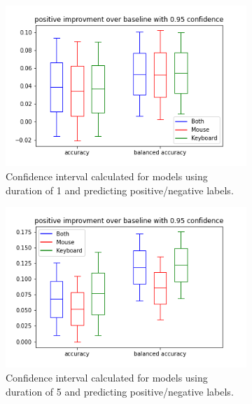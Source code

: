 \begin{figure}[!h]
    \begin{subfigure}[b]{0.31\textwidth}
        \centering
        \includegraphics[width=\textwidth]{figures/results/interval_difference/1/1_positive_0.95.png}
        \captionsetup{justification=centering}
        \caption{Confidence interval calculated for models using duration of 1 and predicting positive/negative labels.}
    \end{subfigure}
    \hfill
    \begin{subfigure}[b]{0.31\textwidth}
        \centering
        \includegraphics[width=\textwidth]{figures/results/interval_difference/5/5_positive_0.95.png}
        \captionsetup{justification=centering}
        \caption{Confidence interval calculated for models using duration of 5 and predicting positive/negative labels.}
    \end{subfigure}
    \begin{subfigure}[b]{0.31\textwidth}

\end{subfigure}
\end{figure}
